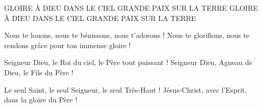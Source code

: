 GLOIRE À DIEU DANS LE CIEL
GRANDE PAIX SUR LA TERRE
GLOIRE À DIEU DANS LE CIEL
GRANDE PAIX SUR LA TERRE

Nous te louons, nous te bénissons, nous t'adorons !
Nous te glorifions, nous te rendons grâce pour ton immense gloire !

Seigneur Dieu, le Roi du ciel, le Père tout puissant !
Seigneur Dieu, Agneau de Dieu, le Fils du Père !

Le seul Saint, le seul Seigneur, le seul Très-Haut !
Jésus-Christ, avec l'Esprit, dans la gloire du Père !

